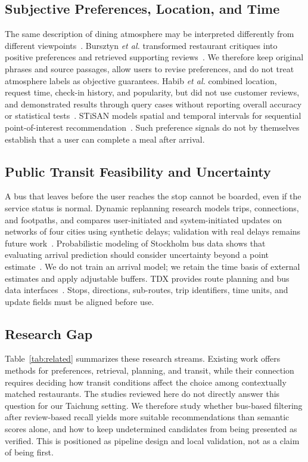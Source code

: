 \documentclass[conference]{IEEEtran}
\begin{document}
\subsection{Subjective Preferences, Location, and Time}
The same description of dining atmosphere may be interpreted differently from different viewpoints~\cite{subjective_attributes}. Bursztyn \emph{et al.} transformed restaurant critiques into positive preferences and retrieved supporting reviews~\cite{critique_preference}. We therefore keep original phrases and source passages, allow users to revise preferences, and do not treat atmosphere labels as objective guarantees. Habib \emph{et al.} combined location, request time, check-in history, and popularity, but did not use customer reviews, and demonstrated results through query cases without reporting overall accuracy or statistical tests~\cite{restaurant_habib}. STiSAN models spatial and temporal intervals for sequential point-of-interest recommendation~\cite{poi_stisan}. Such preference signals do not by themselves establish that a user can complete a meal after arrival.

\subsection{Public Transit Feasibility and Uncertainty}
A bus that leaves before the user reaches the stop cannot be boarded, even if the service status is normal. Dynamic replanning research models trips, connections, and footpaths, and compares user-initiated and system-initiated updates on networks of four cities using synthetic delays; validation with real delays remains future work~\cite{bus_dynamic_replanning}. Probabilistic modeling of Stockholm bus data shows that evaluating arrival prediction should consider uncertainty beyond a point estimate~\cite{bus_delay_uncertainty}. We do not train an arrival model; we retain the time basis of external estimates and apply adjustable buffers. TDX provides route planning and bus data interfaces~\cite{tdx_planner,tdx_bus}. Stops, directions, sub-routes, trip identifiers, time units, and update fields must be aligned before use.

\subsection{Research Gap}
Table~\ref{tab:related} summarizes these research streams. Existing work offers methods for preferences, retrieval, planning, and transit, while their connection requires deciding how transit conditions affect the choice among contextually matched restaurants. The studies reviewed here do not directly answer this question for our Taichung setting. We therefore study whether bus-based filtering after review-based recall yields more suitable recommendations than semantic scores alone, and how to keep undetermined candidates from being presented as verified. This is positioned as pipeline design and local validation, not as a claim of being first.
\end{document}
